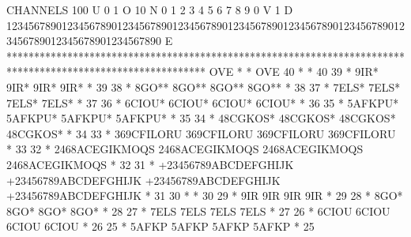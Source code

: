 \begin{Listing}
 CHANNELS 100 U 0                                                                                                  1 O 
           10 N 0        1         2         3         4         5         6         7         8         9         0 V 
            1 D 1234567890123456789012345678901234567890123456789012345678901234567890123456789012345678901234567890 E 
            ************************************************************************************************************
   OVE      *                                                                                                          * OVE
    40      *                                                                                                          *  40
    39      *   9IR*                     9IR*                     9IR*                     9IR*                        *  39
    38      *   8GO**                    8GO**                    8GO**                    8GO**                       *  38
    37      *   7ELS*                    7ELS*                    7ELS*                    7ELS*                       *  37
    36      *   6CIOU*                   6CIOU*                   6CIOU*                   6CIOU*                      *  36
    35      *   5AFKPU*                  5AFKPU*                  5AFKPU*                  5AFKPU*                     *  35
    34      *   48CGKOS*                 48CGKOS*                 48CGKOS*                 48CGKOS*                    *  34
    33      *   369CFILORU               369CFILORU               369CFILORU               369CFILORU                  *  33
    32      *   2468ACEGIKMOQS           2468ACEGIKMOQS           2468ACEGIKMOQS           2468ACEGIKMOQS              *  32
    31      *   +23456789ABCDEFGHIJK     +23456789ABCDEFGHIJK     +23456789ABCDEFGHIJK     +23456789ABCDEFGHIJK        *  31
    30      *                                                                                                          *  30
    29      *   9IR                      9IR                      9IR                      9IR                         *  29
    28      *   8GO*                     8GO*                     8GO*                     8GO*                        *  28
    27      *   7ELS                     7ELS                     7ELS                     7ELS                        *  27
    26      *   6CIOU                    6CIOU                    6CIOU                    6CIOU                       *  26
    25      *   5AFKP                    5AFKP                    5AFKP                    5AFKP                       *  25

\end{Listing}
